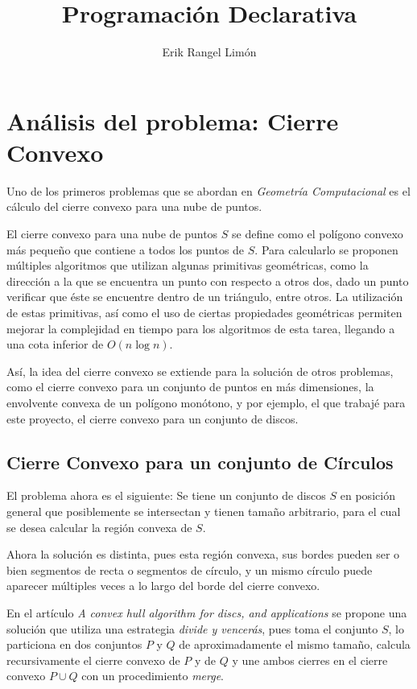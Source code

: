 \documentclass[12pt]{article}
\title{Programación Declarativa}
\author{Erik Rangel Limón}
\begin{document}

\maketitle

\section*{Análisis del problema: Cierre Convexo}

\noindent Uno de los primeros problemas que se abordan en \textit{Geometría Computacional} es el cálculo del cierre convexo para una nube de puntos.

El cierre convexo para una nube de puntos $S$ se define como el polígono convexo más pequeño que contiene a todos los puntos de $S$. Para calcularlo se proponen múltiples algoritmos que utilizan algunas primitivas geométricas, como la dirección a la que se encuentra un punto con respecto a otros dos, dado un punto verificar que éste se encuentre dentro de un triángulo, entre otros. La utilización de estas primitivas, así como el uso de ciertas propiedades geométricas permiten mejorar la complejidad en tiempo para los algoritmos de esta tarea, llegando a una cota inferior de $O(n\log n)$.

Así, la idea del cierre convexo se extiende para la solución de otros problemas, como el cierre convexo para un conjunto de puntos en más dimensiones, la envolvente convexa de un polígono monótono, y por ejemplo, el que trabajé para este proyecto, el cierre convexo para un conjunto de discos.

\subsection*{Cierre Convexo para un conjunto de Círculos}

\noindent El problema ahora es el siguiente: Se tiene un conjunto de discos $S$ en posición general que posiblemente se intersectan y tienen tamaño arbitrario, para el cual se desea calcular la región convexa de $S$.

Ahora la solución es distinta, pues esta región convexa, sus bordes pueden ser o bien segmentos de recta o segmentos de círculo, y un mismo círculo puede aparecer múltiples veces a lo largo del borde del cierre convexo.

En el artículo \textit{A convex hull algorithm for discs, and applications} se propone una solución que utiliza una estrategia \textit{divide y vencerás}, pues toma el conjunto $S$, lo particiona en dos conjuntos $P$ y $Q$ de aproximadamente el mismo tamaño, calcula recursivamente el cierre convexo de $P$ y de $Q$ y une ambos cierres en el cierre convexo $P\cup Q$ con un procedimiento \textit{merge}.
\end{document}

